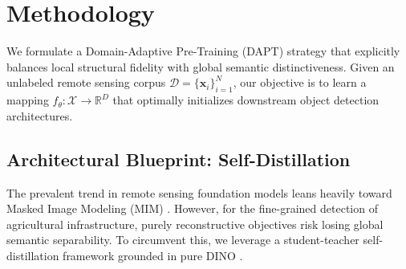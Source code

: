 \section{Methodology}
\label{sec:method}

We formulate a Domain-Adaptive Pre-Training (DAPT) strategy that explicitly balances local structural fidelity with global semantic distinctiveness. Given an unlabeled remote sensing corpus $\mathcal{D} = \{\mathbf{x}_i\}_{i=1}^N$, our objective is to learn a mapping $f_\theta: \mathcal{X} \rightarrow \mathbb{R}^D$ that optimally initializes downstream object detection architectures.

\subsection{Architectural Blueprint: Self-Distillation}
The prevalent trend in remote sensing foundation models leans heavily toward Masked Image Modeling (MIM) \cite{sun2023ringmo}. However, for the fine-grained detection of agricultural infrastructure, purely reconstructive objectives risk losing global semantic separability. To circumvent this, we leverage a student-teacher self-distillation framework grounded in pure DINO \cite{caron2021emerging}. 

